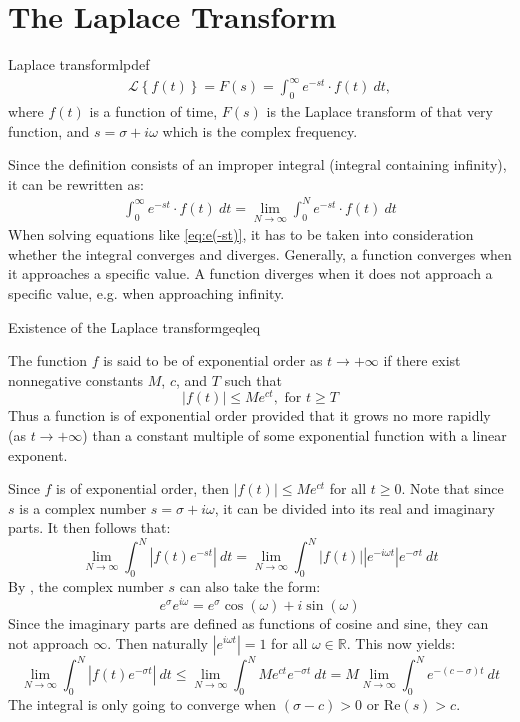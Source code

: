 \section{The Laplace Transform}
\begin{definition}{Laplace transform}{lpdef}
\begin{align}
\mathcal{L} \left\{f(t) \right\}=F(s)=\int_{0}^{\infty} e^{-st}\cdot f(t)\ dt,
\end{align}
where $f(t)$ is a function of time, $F(s)$ is the Laplace transform of that very function, and $s=\sigma+i\omega$ which is the complex frequency.
\end{definition}
\noindent Since the definition consists of an improper integral (integral containing infinity), it can be rewritten as:
\begin{align}
\int_{0}^{\infty} e^{-st}\cdot f(t)\ dt = \lim_{N \to \infty} \int_{0}^{N} e^{-st}\cdot f(t)\ dt \label{eq:e(-st)}
\end{align}
When solving equations like \eqref{eq:e(-st)}, it has to be taken into consideration whether the integral converges and diverges. Generally, a function converges when it approaches a specific value. A function diverges when it does not approach a specific value, e.g. when approaching infinity.

\begin{theorem}{Existence of the Laplace transform}{geqleq}

The function $f$ is said to be of exponential order as $t \rightarrow +\infty$ if there exist nonnegative constants $M$, $c$, and $T$  such that $$|f(t)| \leq Me^{ct},    \text{   for } t \geq T$$
Thus a function is of exponential order provided that it grows no more rapidly (as $t \rightarrow +\infty$) than a constant multiple of some exponential function with a linear exponent. \cite[p. 320]{diffandcomplex}
\end{theorem}
\begin{prof}{}{}
Since $f$ is of exponential order, then $|f(t)| \leq Me^{ct}$ for all $t \geq 0$. Note that since $s$ is a complex number  $s=\sigma+i\omega$, it can be divided into its real and imaginary parts. It then follows that: $$\lim_{N \to \infty} \int_{0}^{N} |f(t)e^{-st}|\ dt = \lim_{N \to \infty} \int_{0}^{N} |f(t)| |e^{-i\omega t}|e^{-\sigma t}\ dt$$
By , the complex number $s$ can also take the form: 
$$e^{\sigma}e^{i\omega}= e^{\sigma}\cos(\omega)+i\sin(\omega)$$
Since the imaginary parts are defined as functions of cosine and sine, they can not approach $\infty$. Then naturally $|e^{i\omega t}|=1$ for all $\omega \in \mathbb{R}$. This now yields: $$\lim_{N \to \infty} \int_{0}^{N} |f(t)e^{-\sigma t}|\ dt \leq \lim_{N \to \infty} \int_{0}^{N} Me^{ct}e^{-\sigma t}\ dt = M \lim_{N \to \infty} \int_{0}^{N}e^{-(c-\sigma)t}\ dt $$ The integral is only going to converge when $(\sigma -c)>0$ or Re$(s)>c$.
\end{prof}

